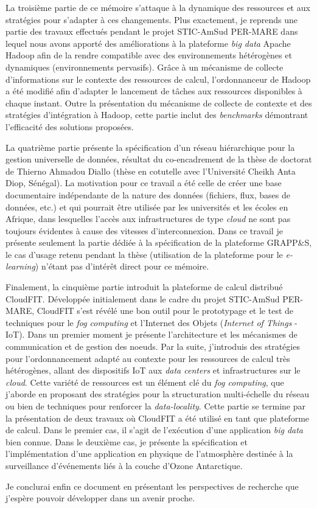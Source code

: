 La troisième partie de ce mémoire s'attaque à la dynamique des ressources et aux stratégies pour s'adapter à ces changements. Plus exactement, je reprends une partie des travaux effectués pendant le projet STIC-AmSud PER-MARE dans lequel nous avons apporté des améliorations à la plateforme \textit{big data} Apache Hadoop afin de la rendre compatible avec des environnements hétérogènes et dynamiques (environnements pervasifs). Grâce à un mécanisme de collecte d'informations sur le contexte des ressources de calcul, l'ordonnanceur de Hadoop a été modifié  afin d'adapter le lancement de tâches aux ressources disponibles à chaque instant. Outre la présentation du mécanisme de collecte de contexte et des stratégies d'intégration à Hadoop, cette partie inclut des \textit{benchmarks} démontrant l'efficacité des solutions proposées. 

La quatrième partie présente la spécification d'un réseau hiérarchique pour la gestion universelle de données, résultat du co-encadrement de la thèse de doctorat de Thierno Ahmadou Diallo (thèse en cotutelle avec l'Université Cheikh Anta Diop, Sénégal). La motivation pour ce travail a été celle de créer une base documentaire indépendante de la nature des données (fichiers, flux, bases de données, etc.) et qui pourrait être utilisée par les universités et les écoles en Afrique, dans lesquelles l'accès aux infrastructures de type \textit{cloud} ne sont pas toujours évidentes à cause des vitesses d'interconnexion. Dans ce travail je présente seulement la partie dédiée à la spécification de la plateforme GRAPP\&S, le cas d'usage retenu pendant la thèse (utilisation de la plateforme pour le \textit{e-learning}) n'étant pas d'intérêt direct pour ce mémoire. 

Finalement, la cinquième partie introduit la plateforme de calcul distribué CloudFIT. Développée initialement dans le cadre du projet STIC-AmSud PER-MARE, CloudFIT s'est révélé une bon outil pour le prototypage et le test de techniques pour le \textit{fog computing} et l'Internet des Objets (\textit{Internet of Things} - IoT). Dans un premier moment je présente l'architecture et les mécanismes de communication et de gestion des n{oe}uds. Par la suite, j'introduis des stratégies pour l'ordonnancement adapté au contexte pour les ressources de calcul très hétérogènes, allant des dispositifs IoT aux \textit{data centers} et infrastructures sur le \textit{cloud}. Cette variété de ressources est un élément clé du \textit{fog computing}, que j'aborde en proposant des stratégies pour la structuration multi-échelle du réseau ou bien de techniques pour renforcer la \textit{data-locality}. Cette partie se termine par la présentation de deux travaux où CloudFIT a été utilisé en tant que plateforme de calcul. Dans le premier cas, il s'agit de l'exécution d'une application \textit{big data} bien connue. Dans le deuxième cas, je présente la spécification et l'implémentation d'une application en physique de l'atmosphère destinée à la surveillance d'événements liés à la couche d'Ozone Antarctique. 

Je conclurai enfin ce document en présentant les perspectives de recherche que j'espère pouvoir développer dans un avenir proche.


 

